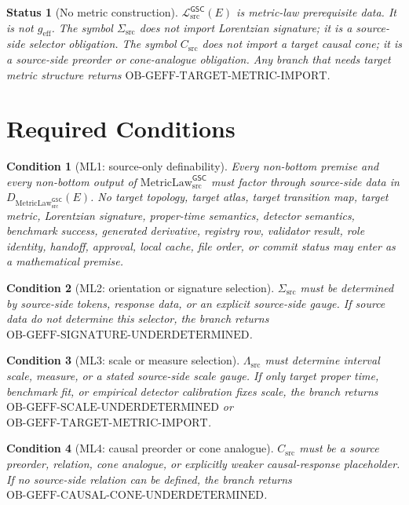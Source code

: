 \documentclass[11pt]{article}
\newcommand{\MetricLaw}{\mathrm{MetricLaw}_{\mathrm{src}}^{\mathsf{GSC}}}
\newcommand{\MetricData}{\mathcal{L}_{\mathrm{src}}^{\mathsf{GSC}}}
\newcommand{\geff}{g_{\mathrm{eff}}}
\newtheorem{condition}{Condition}
\newtheorem{status}{Status}
\begin{document}
\begin{status}[No metric construction]
\(\MetricData(E)\) is metric-law prerequisite data. It is not \(\geff\). The
symbol \(\Sigma_{\mathrm{src}}\) does not import Lorentzian signature; it is a
source-side selector obligation. The symbol \(C_{\mathrm{src}}\) does not
import a target causal cone; it is a source-side preorder or cone-analogue
obligation. Any branch that needs target metric structure returns
\(\mathrm{OB\mbox{-}GEFF\mbox{-}TARGET\mbox{-}METRIC\mbox{-}IMPORT}\).
\end{status}

\section{Required Conditions}

\begin{condition}[ML1: source-only definability]
Every non-bottom premise and every non-bottom output of \(\MetricLaw\) must
factor through source-side data in \(D_{\MetricLaw}(E)\). No target topology,
target atlas, target transition map, target metric, Lorentzian signature,
proper-time semantics, detector semantics, benchmark success, generated
derivative, registry row, validator result, role identity, handoff, approval,
local cache, file order, or commit status may enter as a mathematical premise.
\end{condition}

\begin{condition}[ML2: orientation or signature selection]
\(\Sigma_{\mathrm{src}}\) must be determined by source-side tokens, response
data, or an explicit source-side gauge. If source data do not determine this
selector, the branch returns
\(\mathrm{OB\mbox{-}GEFF\mbox{-}SIGNATURE\mbox{-}UNDERDETERMINED}\).
\end{condition}

\begin{condition}[ML3: scale or measure selection]
\(\Lambda_{\mathrm{src}}\) must determine interval scale, measure, or a stated
source-side scale gauge. If only target proper time, benchmark fit, or
empirical detector calibration fixes scale, the branch returns
\(\mathrm{OB\mbox{-}GEFF\mbox{-}SCALE\mbox{-}UNDERDETERMINED}\) or
\(\mathrm{OB\mbox{-}GEFF\mbox{-}TARGET\mbox{-}METRIC\mbox{-}IMPORT}\).
\end{condition}

\begin{condition}[ML4: causal preorder or cone analogue]
\(C_{\mathrm{src}}\) must be a source preorder, relation, cone analogue, or
explicitly weaker causal-response placeholder. If no source-side relation can
be defined, the branch returns
\(\mathrm{OB\mbox{-}GEFF\mbox{-}CAUSAL\mbox{-}CONE\mbox{-}UNDERDETERMINED}\).
\end{condition}
\end{document}
